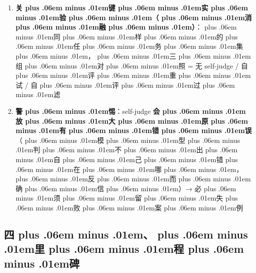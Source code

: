 \documentclass[
]{article}
\providecommand{\tightlist}{%
  \setlength{\itemsep}{0pt}\setlength{\parskip}{0pt}}
\def\zh#1{{\zhfont #1}}
\def\sym#1{{\symfont #1}}
\def\zhglue{\hskip0pt plus .06em minus .01em}
\begin{document}
\begin{enumerate}
  \begin{itemize}
  \tightlist
  \item
    \textbf{\zh{自\zhglue 评\zhglue 重\zhglue 试}}\zh{：\zhglue 模\zhglue 型\zhglue 给\zhglue 自\zhglue 己\zhglue 打\zhglue 分\zhglue ，\zhglue 低\zhglue 于\zhglue 阈\zhglue 值\zhglue 就\zhglue 重\zhglue 做\zhglue （}rasbt ch5 \zh{的} self-refinement\zh{）}
  \item
    \textbf{\zh{自\zhglue 评\zhglue 过\zhglue 滤}}\zh{：\zhglue 生\zhglue 成\zhglue 多\zhglue 个\zhglue 候\zhglue 选\zhglue ，\zhglue 自\zhglue 己\zhglue 挑\zhglue 最\zhglue 好\zhglue 的\zhglue （}best-of-N \zh{的\zhglue 变\zhglue 体\zhglue ）}
  \end{itemize}
\item
  \textbf{\zh{关\zhglue 键\zhglue 实\zhglue 验\zhglue （\zhglue 消\zhglue 融\zhglue ）}}\zh{：\zhglue 同\zhglue 样\zhglue 的\zhglue 任\zhglue 务\zhglue 集\zhglue ，\zhglue 三\zhglue 组\zhglue 对\zhglue 照} = \zh{无} self-judge / \zh{自\zhglue 评\zhglue 重\zhglue 试} / \zh{自\zhglue 评\zhglue 过\zhglue 滤}
\item
  \textbf{\zh{警\zhglue 惕}}\zh{：}self-judge \textbf{\zh{会\zhglue 放\zhglue 大\zhglue 原\zhglue 有\zhglue 错\zhglue 误}}\zh{（\zhglue 模\zhglue 型\zhglue 判\zhglue 不\zhglue 出\zhglue 自\zhglue 己\zhglue 错\zhglue 在\zhglue 哪\zhglue ，\zhglue 反\zhglue 而\zhglue 确\zhglue 信\zhglue ）}\sym{→} \zh{必\zhglue 须\zhglue 留\zhglue 失\zhglue 败\zhglue 案\zhglue 例}
\end{enumerate}

\subsection{\zh{四\zhglue 、\zhglue 里\zhglue 程\zhglue 碑}}\label{ux56dbux91ccux7a0bux7891}
\end{document}
